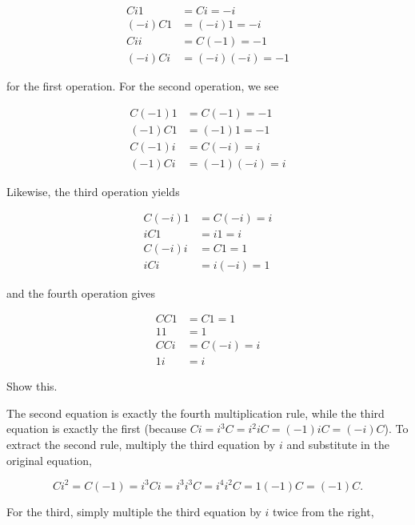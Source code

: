 \documentclass[../the-road-to-reality.tex]{subfiles}
\begin{document}
\begin{questions}
\begin{solution}
        \begin{align*}
                Ci1 &= Ci = -i \\
                (-i)C1 &= (-i)1 = -i \\
                Cii &= C(-1) = -1 \\
                (-i)Ci &= (-i)(-i) = -1
        \end{align*}

        for the first operation. For the second operation, we see

        \begin{align*}
                C(-1)1 &= C(-1) = -1 \\
                (-1)C1 &= (-1)1 = -1 \\
                C(-1)i &= C(-i) = i \\
                (-1)Ci &= (-1)(-i) = i
        \end{align*}

        Likewise, the third operation yields

        \begin{align*}
                C(-i)1 &= C(-i) = i \\
                iC1 &= i1 = i \\
                C(-i)i &= C1 = 1 \\
                iCi &= i(-i) = 1
        \end{align*}

        and the fourth operation gives

        \begin{align*}
                CC1 &= C1 = 1 \\
                11 &= 1 \\
                CCi &= C(-i) = i \\
                1i &= i
        \end{align*}
\end{solution}

\question Show this.

\begin{solution}
        The second equation is exactly the fourth multiplication rule, while the third equation is exactly the first (because $Ci = i^3C = i^2iC = (-1)iC = (-i)C$). To extract the second rule, multiply the third equation by $i$ and substitute in the original equation,

	\[
        Ci^2 = C(-1) = i^3Ci = i^3i^3C = i^4i^2C = 1(-1)C = (-1)C
	.\] 

        For the third, simply multiple the third equation by $i$ twice from the right,


\end{solution}
\end{questions}
\end{document}
